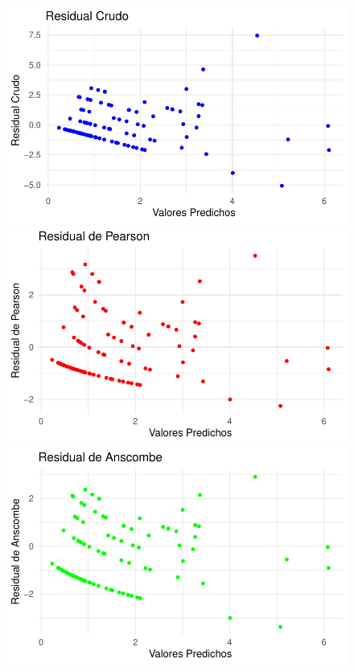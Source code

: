 \documentclass[
  letterpaper,
  DIV=11,
  numbers=noendperiod]{scrartcl}
\begin{document}
\begin{figure}

\begin{minipage}{0.50\linewidth}
\includegraphics{Modelos_files/figure-pdf/unnamed-chunk-24-1.pdf}\end{minipage}%
%
\begin{minipage}{0.50\linewidth}
\includegraphics{Modelos_files/figure-pdf/unnamed-chunk-24-2.pdf}\end{minipage}%
\newline
\begin{minipage}{0.50\linewidth}
\includegraphics{Modelos_files/figure-pdf/unnamed-chunk-24-3.pdf}\end{minipage}%

\end{figure}
\end{document}
